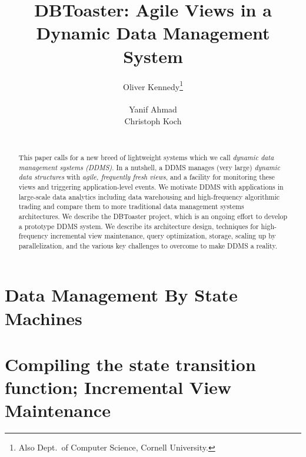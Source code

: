 \documentclass{sig-alternate}
\begin{document}
\title{DBToaster: Agile Views in a\\Dynamic Data Management System}
\author{
\alignauthor
Oliver Kennedy\thanks{Also Dept.\ of Computer Science, Cornell University.}\\
     \\
\alignauthor
Yanif Ahmad\\
\alignauthor
Christoph Koch\\
     \\
}
\maketitle

\begin{abstract}
This paper calls for a new breed of lightweight systems which
we call {\em dynamic data management systems (DDMS)}\/.
In a nutshell,
a DDMS manages (very large) {\em dynamic data structures}\/ with 
{\em agile, frequently fresh views}\/, and a facility for monitoring
these views and triggering application-level events.
%
We motivate DDMS with applications in large-scale data analytics
including data warehousing and high-frequency algorithmic trading
and compare them to more traditional data management systems 
architectures.
%
We describe the DBToaster project, which is an ongoing effort to
develop a prototype DDMS system. We describe its architecture
design, techniques for high-frequency incremental view maintenance,
query optimization, storage, scaling up by parallelization, and
the various key challenges to overcome to make DDMS a reality.
\end{abstract}



\section{Data Management By State Machines}

\label{sec:overview}


\section{Compiling the state transition function; Incremental View Maintenance}
\label{sec:dbtoaster}

\end{document}

